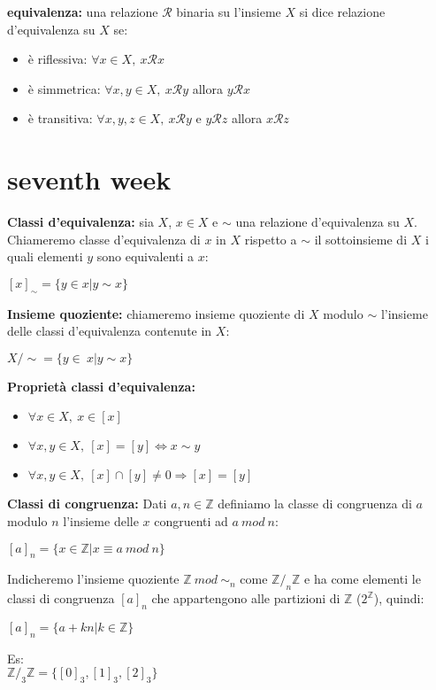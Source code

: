 \documentclass[11pt, letterpaper]{article}
\begin{document}
\textbf{equivalenza:} una relazione $\mathcal{R}$ binaria su l'insieme $X$ si dice relazione d'equivalenza su $X$ se:
\begin{itemize}
    \item è riflessiva: $\forall x\in X,\ x\mathcal{R}x$
    \item è simmetrica: $\forall x,y\in X,\ x\mathcal{R}y$ allora $y\mathcal{R}x$
    \item è transitiva: $\forall x,y,z\in X,\ x\mathcal{R}y$ e $y\mathcal{R}z$ allora $x\mathcal{R}z$
\end{itemize}

\newpage
\section{seventh week}

\textbf{Classi d'equivalenza:} sia $X$, $x\in X$ e $\sim$ una relazione d'equivalenza su $X$. Chiameremo classe
d'equivalenza di $x$ in $X$ rispetto a $\sim$ il sottoinsieme di $X$ i quali elementi $y$ sono equivalenti a $x$:
\begin{center}
    $[x]_{\sim}=\{y\in x| y\sim x\}$
\end{center}

\textbf{Insieme quoziente:} chiameremo insieme quoziente di $X$ modulo $\sim$ l'insieme delle classi d'equivalenza
contenute in $X$:
\begin{center}
    $X/\sim =\{ y\in\ x| y\sim x\}$
\end{center}

\textbf{Proprietà classi d'equivalenza:}
\begin{itemize}
    \item $\forall x\in X,\ x\in [x]$
    \item $\forall x,y\in X,\ [x]=[y] \Leftrightarrow x\sim y$
    \item $\forall x,y\in X,\ [x]\cap [y]\neq 0\Rightarrow [x]=[y]$
\end{itemize}

\textbf{Classi di congruenza:} Dati $a,n\in\mathbb{Z}$ definiamo la classe di congruenza di $a$ modulo
$n$ l'insieme delle $x$ congruenti ad $a\ mod\ n$:
\begin{center}
    $[a]_{n}=\{x\in\mathbb{Z}|x\equiv a\ mod\ n\}$
\end{center}
Indicheremo l'insieme quoziente $\mathbb{Z}\ mod\ \sim_{n}$ come $\mathbb{Z}/_{n}\mathbb{Z}$ e ha 
come elementi le classi di congruenza $[a]_{n}$ che appartengono alle partizioni di $\mathbb{Z}$
($2^{\mathbb{Z}}$), quindi:
\begin{center}
    $[a]_{n}=\{a+kn|k\in\mathbb{Z}\}$
\end{center}
Es:\\ $\mathbb{Z}/_{3}\mathbb{Z}=\{[0]_{3},[1]_{3},[2]_{3}\}$
\end{document}
